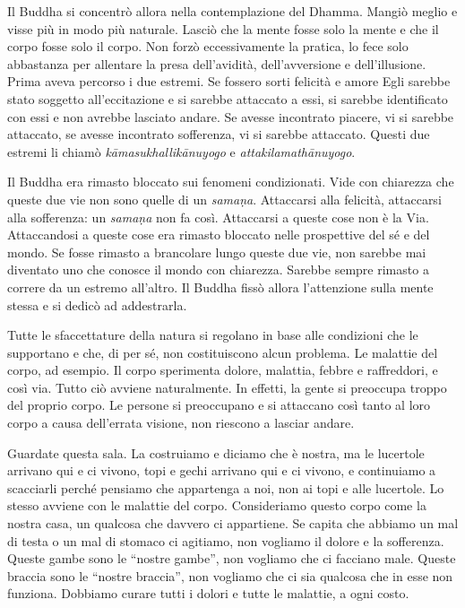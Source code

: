 Il Buddha si concentrò allora nella contemplazione del Dhamma. Mangiò
meglio e visse più in modo più naturale. Lasciò che la mente fosse solo
la mente e che il corpo fosse solo il corpo. Non forzò eccessivamente la
pratica, lo fece solo abbastanza per allentare la presa dell'avidità,
dell'avversione e dell'illusione. Prima aveva percorso i due estremi. Se
fossero sorti felicità e amore Egli sarebbe stato soggetto
all'eccitazione e si sarebbe attaccato a essi, si sarebbe identificato
con essi e non avrebbe lasciato andare. Se avesse incontrato piacere, vi
si sarebbe attaccato, se avesse incontrato sofferenza, vi si sarebbe
attaccato. Questi due estremi li chiamò \emph{kāmasukhallikānuyogo} e
\emph{attakilamathānuyogo}.

Il Buddha era rimasto bloccato sui fenomeni condizionati. Vide con
chiarezza che queste due vie non sono quelle di un \emph{samaṇa}.
Attaccarsi alla felicità, attaccarsi alla sofferenza: un \emph{samaṇa}
non fa così. Attaccarsi a queste cose non è la Via. Attaccandosi a
queste cose era rimasto bloccato nelle prospettive del sé e del mondo.
Se fosse rimasto a brancolare lungo queste due vie, non sarebbe mai
diventato uno che conosce il mondo con chiarezza. Sarebbe sempre rimasto
a correre da un estremo all'altro. Il Buddha fissò allora l'attenzione
sulla mente stessa e si dedicò ad addestrarla.

Tutte le sfaccettature della natura si regolano in base alle condizioni
che le supportano e che, di per sé, non costituiscono alcun problema. Le
\mbox{malattie} del corpo, ad esempio. Il corpo sperimenta dolore, malattia,
febbre e raffreddori, e così via. Tutto ciò avviene naturalmente. In
effetti, la gente si preoccupa troppo del proprio corpo. Le persone si
preoccupano e si attaccano così tanto al loro corpo a causa dell'errata
visione, non riescono a lasciar andare.

Guardate questa sala. La costruiamo e diciamo che è nostra, ma le
lucertole arrivano qui e ci vivono, topi e gechi arrivano qui e ci
vivono, e continuiamo a scacciarli perché pensiamo che appartenga a noi,
non ai topi e alle lucertole. Lo stesso avviene con le malattie del
corpo. Consideriamo questo corpo come la nostra casa, un qualcosa che
davvero ci appartiene. Se capita che abbiamo un mal di testa o un mal di
stomaco ci agitiamo, non vogliamo il dolore e la sofferenza. Queste
gambe sono le ``nostre gambe'', non vogliamo che ci facciano male.
Queste braccia sono le ``nostre braccia'', non vogliamo che ci sia
qualcosa che in esse non funziona. Dobbiamo curare tutti i dolori e
tutte le malattie, a ogni costo.


